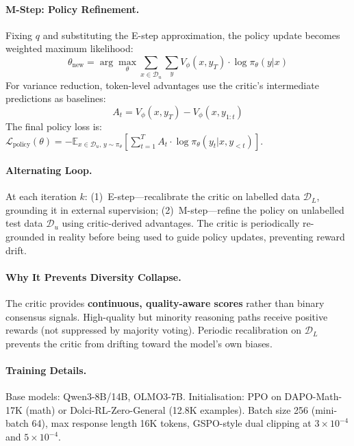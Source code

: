 \documentclass[11pt]{article}
\begin{document}
\paragraph{M-Step: Policy Refinement.}
Fixing $q$ and substituting the E-step approximation, the policy update becomes weighted maximum likelihood:
\begin{equation}
    \theta_{\mathrm{new}} = \arg\max_\theta \sum_{x \in \mathcal{D}_u} \sum_y V_\phi(x, y_T) \cdot \log \pi_\theta(y|x)
\end{equation}
For variance reduction, token-level advantages use the critic's intermediate predictions as baselines:
\begin{equation}
    A_t = V_\phi(x, y_T) - V_\phi(x, y_{1:t})
\end{equation}
The final policy loss is: $\mathcal{L}_{\mathrm{policy}}(\theta) = -\mathbb{E}_{x \in \mathcal{D}_u,\, y \sim \pi_\theta}\!\left[\sum_{t=1}^{T} A_t \cdot \log \pi_\theta(y_t | x, y_{<t})\right]$.

\paragraph{Alternating Loop.}
At each iteration $k$: (1)~E-step---recalibrate the critic on labelled data $\mathcal{D}_L$, grounding it in external supervision; (2)~M-step---refine the policy on unlabelled test data $\mathcal{D}_u$ using critic-derived advantages. The critic is periodically re-grounded in reality before being used to guide policy updates, preventing reward drift.

\paragraph{Why It Prevents Diversity Collapse.}
The critic provides \textbf{continuous, quality-aware scores} rather than binary consensus signals. High-quality but minority reasoning paths receive positive rewards (not suppressed by majority voting). Periodic recalibration on $\mathcal{D}_L$ prevents the critic from drifting toward the model's own biases.

\paragraph{Training Details.}
Base models: Qwen3-8B/14B, OLMO3-7B. Initialisation: PPO on DAPO-Math-17K (math) or Dolci-RL-Zero-General (12.8K examples). Batch size 256 (mini-batch 64), max response length 16K tokens, GSPO-style dual clipping at $3 \times 10^{-4}$ and $5 \times 10^{-4}$.
\end{document}
